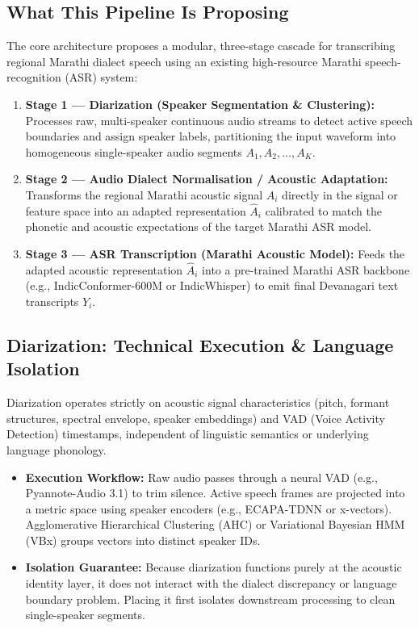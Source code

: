 \documentclass[11pt]{article}
\begin{document}
\subsection{What This Pipeline Is Proposing}
The core architecture proposes a modular, three-stage cascade for transcribing regional Marathi dialect speech using an existing high-resource Marathi speech-recognition (ASR) system:
\begin{enumerate}[leftmargin=*]
  \item \textbf{Stage 1 --- Diarization (Speaker Segmentation \& Clustering):}
    Processes raw, multi-speaker continuous audio streams to detect active speech boundaries and assign speaker labels, partitioning the input waveform into homogeneous single-speaker audio segments $A_1, A_2, \dots, A_K$.
  \item \textbf{Stage 2 --- Audio Dialect Normalisation / Acoustic Adaptation:}
    Transforms the regional Marathi acoustic signal $A_i$ directly in the signal or feature space into an adapted representation $\hat{A}_i$ calibrated to match the phonetic and acoustic expectations of the target Marathi ASR model.
  \item \textbf{Stage 3 --- ASR Transcription (Marathi Acoustic Model):}
    Feeds the adapted acoustic representation $\hat{A}_i$ into a pre-trained Marathi ASR backbone (e.g., IndicConformer-600M or IndicWhisper) to emit final Devanagari text transcripts $Y_i$.
\end{enumerate}

\subsection{Diarization: Technical Execution \& Language Isolation}
Diarization operates strictly on acoustic signal characteristics (pitch, formant structures, spectral envelope, speaker embeddings) and VAD (Voice Activity Detection) timestamps, independent of linguistic semantics or underlying language phonology.
\begin{itemize}[leftmargin=*]
  \item \textbf{Execution Workflow:} Raw audio passes through a neural VAD (e.g., Pyannote-Audio 3.1) to trim silence. Active speech frames are projected into a metric space using speaker encoders (e.g., ECAPA-TDNN or x-vectors). Agglomerative Hierarchical Clustering (AHC) or Variational Bayesian HMM (VBx) groups vectors into distinct speaker IDs.
  \item \textbf{Isolation Guarantee:} Because diarization functions purely at the acoustic identity layer, it does not interact with the dialect discrepancy or language boundary problem. Placing it first isolates downstream processing to clean single-speaker segments.
\end{itemize}
\end{document}
